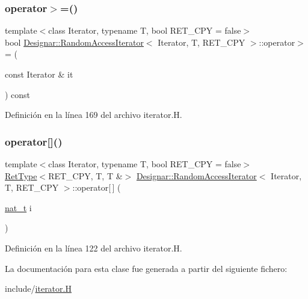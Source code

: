 \subsubsection{\texorpdfstring{operator$>$=()}{operator>=()}}
{\footnotesize\ttfamily template$<$class Iterator, typename T, bool R\+E\+T\+\_\+\+C\+PY = false$>$ \\
bool \hyperlink{class_designar_1_1_random_access_iterator}{Designar\+::\+Random\+Access\+Iterator}$<$ Iterator, T, R\+E\+T\+\_\+\+C\+PY $>$\+::operator$>$= (\begin{DoxyParamCaption}\item[{const Iterator \&}]{it }\end{DoxyParamCaption}) const\hspace{0.3cm}{\ttfamily [inline]}}



Definición en la línea 169 del archivo iterator.\+H.

\mbox{\label{class_designar_1_1_random_access_iterator_a19e24a37b546cb41aed275ff61fbc0b7}} 
\subsubsection{\texorpdfstring{operator[]()}{operator[]()}}
{\footnotesize\ttfamily template$<$class Iterator, typename T, bool R\+E\+T\+\_\+\+C\+PY = false$>$ \\
\hyperlink{namespace_designar_ab937f9c4bf5f1d0e65dbc616245d50ee}{Ret\+Type}$<$R\+E\+T\+\_\+\+C\+PY, T, T \&$>$ \hyperlink{class_designar_1_1_random_access_iterator}{Designar\+::\+Random\+Access\+Iterator}$<$ Iterator, T, R\+E\+T\+\_\+\+C\+PY $>$\+::operator\mbox{[}$\,$\mbox{]} (\begin{DoxyParamCaption}\item[{\hyperlink{namespace_designar_aa72662848b9f4815e7bf31a7cf3e33d1}{nat\+\_\+t}}]{i }\end{DoxyParamCaption})\hspace{0.3cm}{\ttfamily [inline]}}



Definición en la línea 122 del archivo iterator.\+H.



La documentación para esta clase fue generada a partir del siguiente fichero\+:\begin{DoxyCompactItemize}
\item 
include/\hyperlink{iterator_8_h}{iterator.\+H}\end{DoxyCompactItemize}
